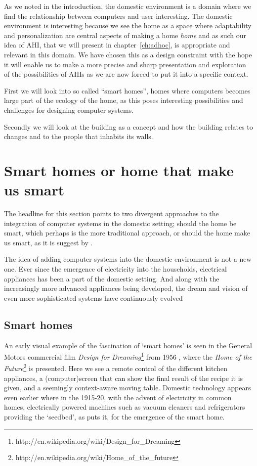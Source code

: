 As we noted in the introduction, the domestic environment is a domain where we find the relationship between computers and user interesting.
The domestic environment is interesting because we see the home as a space where adaptability and personalization are central aspects of making a home \emph{home} and as such our idea of AHI, that we will present in chapter~\ref{ch:adhoc}, is appropriate and relevant in this domain.
We have chosen this as a design constraint with the hope it will enable us to make a more precise and sharp presentation and exploration of the possibilities of AHIs as we are now forced to put it into a specific context.

First we will look into so called ``smart homes'', homes where computers becomes large part of the ecology of the home, as this poses interesting possibilities and challenges for designing computer systems.

Secondly we will look at the building as a concept and how the building relates to changes and to the people that inhabits its walls.

\section{Smart homes or home that make us smart}
The headline for this section points to two divergent approaches to the integration of computer systems in the domestic setting; should the home be smart, which perhaps is the more traditional approach, or should the home make us smart, as it is suggest by \citet{taylor2007homes}.

The idea of adding computer systems into the domestic environment is not a new one.
Ever since the emergence of electricity into the households, electrical appliances has been a part of the domestic setting.
And along with the increasingly more advanced appliances being developed, the dream and vision of even more sophisticated systems have continuously evolved

\subsection{Smart homes}
An early visual example of the fascination of `smart homes' is seen in the General Motors commercial film \emph{Design for Dreaming}\footnote{http://en.wikipedia.org/wiki/Design\_for\_Dreaming} from 1956 \citep{designfordreaming}, where the \emph{Home of the Future}\footnote{http://en.wikipedia.org/wiki/Home\_of\_the\_future} is presented.
Here we see a remote control of the different kitchen appliances, a (computer)screen that can show the final result of the recipe it is given, and a seemingly context-aware moving table.
Domestic technology appears even earlier where in the 1915-20, with the advent of electricity in common homes, electrically powered machines such as vacuum cleaners and refrigerators providing the `seedbed', as \citet{aldrich2003smart} puts it, for the emergence of the smart home.

